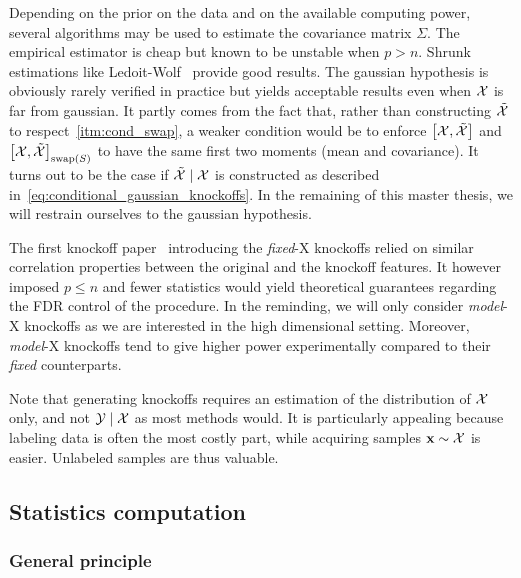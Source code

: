 Depending on the prior on the data and on the available computing power,
several algorithms may be used to estimate the covariance matrix $\Sigma$.
The empirical estimator is cheap but known to be unstable when $p > n$.
Shrunk estimations like Ledoit-Wolf~\cite{ledoit_wolf} provide good results.
\bigbreak
The gaussian hypothesis is obviously rarely verified in practice but yields acceptable results even when
$\mathcal{X}$ is far from gaussian.
It partly comes from the fact that, rather than constructing $\tilde{\mathcal{X}}$ to respect~\ref{itm:cond_swap},
a weaker condition would be to enforce $\big[ \mathcal{X}, \tilde{\mathcal{X}} \big]$ and $\big[ \mathcal{X}, \tilde{\mathcal{X}} \big]_{\operatorname{swap}(S)}$ to have the
same first two moments (mean and covariance).
It turns out to be the case if $\tilde{\mathcal{X}} \mid \mathcal{X}$ is constructed as described in~\ref{eq:conditional_gaussian_knockoffs}.
In the remaining of this master thesis, we will restrain ourselves to the gaussian hypothesis.

The first knockoff paper~\cite{fixed_x_knockoffs} introducing the \textit{fixed}-X knockoffs relied on similar correlation
properties between the original and the knockoff features.
It however imposed $p \leq n$ and fewer statistics would yield theoretical guarantees regarding the FDR control
of the procedure.
In the reminding, we will only consider \textit{model}-X knockoffs as we are interested in the high dimensional
setting.
Moreover, \textit{model}-X knockoffs tend to give higher power experimentally compared to their \textit{fixed}
counterparts.

Note that generating knockoffs requires an estimation of the distribution of $\mathcal{X}$ only,
and not $\mathcal{Y} \mid \mathcal{X}$ as most methods would.
It is particularly appealing because labeling data is often the most costly part,
while acquiring samples $\mathbf{x} \sim \mathcal{X}$ is easier.
Unlabeled samples are thus valuable.

\subsection{Statistics computation}\label{subsec:ksc}

\subsubsection{General principle}\label{subsubsec:scg}

